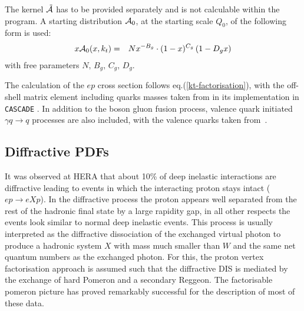 The kernel ${\cal \tilde A}$ has to be provided separately and is not
 calculable within the program. A starting distribution  ${\cal A}_0$, 
 at the starting scale $Q_0$, of the following form is used:
\begin{eqnarray}
x{\cal A}_0(x,\kt) &=& N x^{-B_g} \cdot (1 -x)^{C_g}\left( 1 -D_g x\right) 
\label{a0}
\end{eqnarray}
with free parameters $N,\, B_g,\, C_g,\, D_g$. 

The calculation of the $ep$ cross section follows eq.(\ref{kt-factorisation}), 
with the off-shell matrix element including quarks masses taken from \cite{Catani:1990eg} 
in its implementation in {\tt CASCADE} \cite{Jung:2010si}.
In addition to the boson gluon fusion process, valence quark initiated 
$\gamma q\to q$ processes are also included, with the valence quarks taken from~\cite{Deak:2010gk}.

\subsection{Diffractive PDFs}

\newcommand{\asotp}{\ensuremath{\frac{\alpha_{\rm s}}{2\pi}}}
\newcommand{\Sgl}[1]{\ensuremath{\tilde f_{#1+}}}
\newcommand{\Pom}{{I\!P}}
\newcommand{\Reg}{{I\!R}}
\newcommand{\xpom}{$x_{I\!P}$}

It was observed at HERA that about 10\%
of deep inelastic interactions are diffractive leading to
events in which the interacting proton stays intact ($ep\to eXp$). 
In the diffractive process the proton appears well separated from the 
rest of the hadronic final state by a large rapidity gap, 
in all other respects the events look similar to normal deep inelastic events.
This process is usually  interpreted as the diffractive dissociation 
of the exchanged virtual photon to produce a hadronic 
system $X$ with mass much smaller than $W$ and the same net quantum numbers as the exchanged photon.
For this, the proton vertex factorisation approach
is assumed such that  the diffractive DIS is mediated by the exchange of hard Pomeron and a
secondary Reggeon.  The factorisable pomeron picture has proved remarkably successful for the description of most of these data.
%

